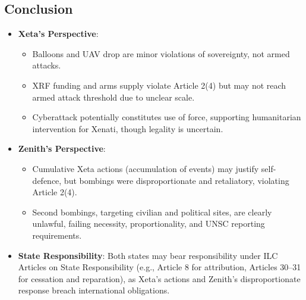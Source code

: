\subsection{Conclusion}
\begin{itemize}
    \item \textbf{Xeta’s Perspective}:
    \begin{itemize}
        \item Balloons and UAV drop are minor violations of sovereignty, not armed attacks.
        \item XRF funding and arms supply violate Article 2(4) but may not reach armed attack threshold due to unclear scale.
        \item Cyberattack potentially constitutes use of force, supporting humanitarian intervention for Xenati, though legality is uncertain.
    \end{itemize}
    \item \textbf{Zenith’s Perspective}:
    \begin{itemize}
        \item Cumulative Xeta actions (accumulation of events) may justify self-defence, but bombings were disproportionate and retaliatory, violating Article 2(4).
        \item Second bombings, targeting civilian and political sites, are clearly unlawful, failing necessity, proportionality, and UNSC reporting requirements.
    \end{itemize}
    \item \textbf{State Responsibility}: Both states may bear responsibility under ILC Articles on State Responsibility (e.g., Article 8 for attribution, Articles 30–31 for cessation and reparation), as Xeta’s actions and Zenith’s disproportionate response breach international obligations.
\end{itemize}


